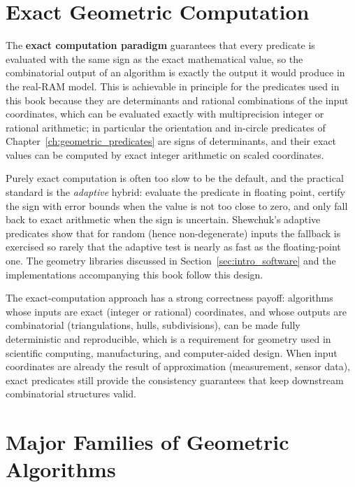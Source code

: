 
\section{Exact Geometric Computation}
\label{sec:intro_exact_computation}

The \textbf{exact computation paradigm} guarantees that every predicate is
evaluated with the same sign as the exact mathematical value, so the
combinatorial output of an algorithm is exactly the output it would produce
in the real-RAM model. This is achievable in principle for the predicates
used in this book because they are determinants and rational combinations
of the input coordinates, which can be evaluated exactly with multiprecision
integer or rational arithmetic; in particular the orientation and in-circle
predicates of Chapter~\ref{ch:geometric_predicates} are signs of
determinants, and their exact values can be computed by exact integer
arithmetic on scaled coordinates.

Purely exact computation is often too slow to be the default, and the
practical standard is the \emph{adaptive} hybrid: evaluate the predicate in
floating point, certify the sign with error bounds when the value is not too
close to zero, and only fall back to exact arithmetic when the sign is
uncertain. Shewchuk's adaptive predicates \cite{shewchuk1997} show that for
random (hence non-degenerate) inputs the fallback is exercised so rarely that
the adaptive test is nearly as fast as the floating-point one. The geometry
libraries discussed in Section~\ref{sec:intro_software} and the
implementations accompanying this book follow this design.

The exact-computation approach has a strong correctness payoff: algorithms
whose inputs are exact (integer or rational) coordinates, and whose outputs
are combinatorial (triangulations, hulls, subdivisions), can be made fully
deterministic and reproducible, which is a requirement for geometry used in
scientific computing, manufacturing, and computer-aided design. When input
coordinates are already the result of approximation (measurement, sensor
data), exact predicates still provide the consistency guarantees that keep
downstream combinatorial structures valid.


\section{Major Families of Geometric Algorithms}
\label{sec:intro_families}

